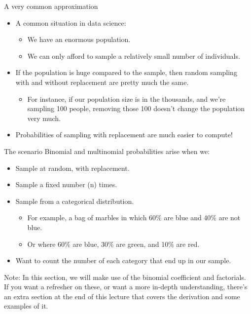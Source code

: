 \documentclass[aspectratio=169]{../latex_main/tntbeamer}  %
\begin{document}
	
	\begin{frame}{A very common approximation}
	    \begin{itemize}
	        \item A common situation in data science:
	        \begin{itemize}
	            \item We have an enormous population.
	            \item We can only afford to sample a relatively small number of individuals.
	        \end{itemize}
	        \item If the population is huge compared to the sample, then random sampling with and without replacement are pretty much the same.
	        \begin{itemize}
	            \item For instance, if our population size is in the thousands, and we’re sampling 100 people, removing those 100 doesn’t change the population very much.
	        \end{itemize}
	        \item Probabilities of sampling with replacement are much easier to compute!
	    \end{itemize}
	\end{frame}
	
	
	
		\begin{frame}{The scenario}
	Binomial and multinomial probabilities arise when we:
	\begin{itemize}
	    \item Sample at random, with replacement.
	    \item Sample a fixed number (n) times.
	    \item Sample from a categorical distribution.
	    \begin{itemize}
	        \item For example, a bag of marbles in which 60\% are blue and 40\% are not blue.
	        \item Or where 60\% are blue, 30\% are green, and 10\% are red.
	    \end{itemize}
	    \item Want to count the number of each category that end up in our sample.
	\end{itemize}
	    Note: In this section, we will make use of the binomial coefficient and factorials. If you want a refresher on these, or want a more in-depth understanding, there’s an extra section at the end of this lecture that covers the derivation and some examples of it.

	\end{frame}
	
\end{document}
